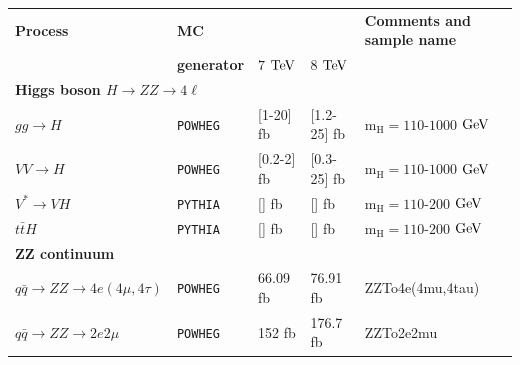 \begin{table}[htbp]
  \begin{center}
  \vspace*{0.3cm}
  \renewcommand{\arraystretch}{0.5}
    \begin{tabular}{lllll} 
\hline %
\small      \bf{Process} 		& \small \bf{MC}			& \multicolumn{2}{c}{\small\boldmath{$\sigma_{(N)NLO} $}} & \small\bf{ Comments and sample name}  \\
     					& \small \bf{generator}			& \small $7$ $\rm{TeV}$ 	& \small $8$ $\rm{TeV}$        			  &		                          \\ 
\hline \hline %
%
         \multicolumn{5}{l}{\small  \bf{Higgs boson}   $H \rightarrow ZZ \rightarrow 4\ell$} \\
%     	      
\small         ${gg} \rightarrow H$ & \small{\tt POWHEG}  & \small [1-20] fb 	& \small [1.2-25] fb        & \small{\small $\mathrm{m_{H}=110}$-$1000$ $\rm{GeV}$}  \\ 
\small         $VV \rightarrow H$   & \small{\tt POWHEG}  & \small [0.2-2] fb 	& \small [0.3-25] fb        & \small{\small $\mathrm{m_{H}=110}$-$1000$ $\rm{GeV}$}  \\ 
\small         $V^{*} \rightarrow VH$   & \small{\tt PYTHIA}  & \small [] fb 	& \small [] fb        & \small{\small $\mathrm{m_{H}=110}$-$200$ $\rm{GeV}$}  \\ 
\small         $t\bar{t}H$   & \small{\tt PYTHIA}  & \small [] fb 	& \small [] fb        & \small{\small $\mathrm{m_{H}=110}$-$200$ $\rm{GeV}$}  \\ 
\hline %
         \multicolumn{5}{l}{{\small   \bf ZZ continuum } } \\
\small    $ q\bar{q} \rightarrow ZZ \rightarrow 4e(4\mu,4\tau) $           
                                    	  & \small{\tt POWHEG}	& \small 66.09 fb	& \small 76.91 fb	    & \small{\small ZZTo4e(4mu,4tau)}  \\ 
\small	 $ q\bar{q} \rightarrow ZZ \rightarrow 2e2\mu  $           
                                    	  & \small{\tt POWHEG}	& \small 152 fb	& \small 176.7 fb	    & \small{\small ZZTo2e2mu}  \\ 

\end{tabular}
\end{center}
\end{table}
